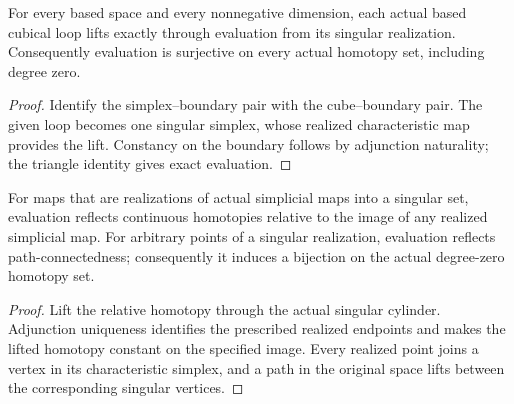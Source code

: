 \begin{proposition}
  \label{prop:actual-singular-evaluation-surjectivity}
  \leanok
  For every based space and every nonnegative dimension, each actual based cubical loop lifts exactly through evaluation from its singular realization. Consequently evaluation is surjective on every actual homotopy set, including degree zero.
\end{proposition}
\begin{proof}
  Identify the simplex--boundary pair with the cube--boundary pair. The given loop becomes one singular simplex, whose realized characteristic map provides the lift. Constancy on the boundary follows by adjunction naturality; the triangle identity gives exact evaluation.
  \leanok
\end{proof}

\begin{proposition}
  \label{prop:actual-singular-relative-comparison}
  \leanok
  For maps that are realizations of actual simplicial maps into a singular set, evaluation reflects continuous homotopies relative to the image of any realized simplicial map. For arbitrary points of a singular realization, evaluation reflects path-connectedness; consequently it induces a bijection on the actual degree-zero homotopy set.
\end{proposition}
\begin{proof}
  Lift the relative homotopy through the actual singular cylinder. Adjunction uniqueness identifies the prescribed realized endpoints and makes the lifted homotopy constant on the specified image. Every realized point joins a vertex in its characteristic simplex, and a path in the original space lifts between the corresponding singular vertices.
  \leanok
\end{proof}

